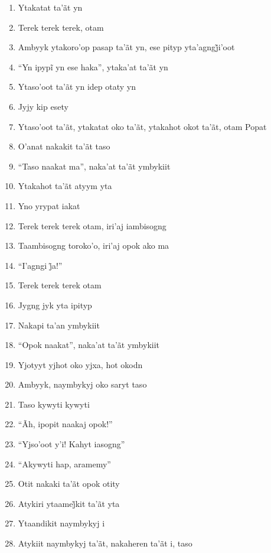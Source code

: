\begin{enumerate}
 \item Ytakatat ta'ãt yn
 \item Terek terek terek, otam
 \item Ambyyk ytakoro’op pasap ta’ãt yn, ese pityp yta’agngj̃i’oot
 \item ``Yn ipypĩ yn ese haka'', ytaka’at ta’ãt yn
 \item Ytaso'oot ta'ãt yn idep otaty yn
 \item Jyjy kip esety
 \begin{center}\end{center}
 \item Ytaso'oot ta'ãt, ytakatat oko ta'ãt, ytakahot okot ta'ãt, otam Popat
 \item O'anat nakakit ta'ãt taso
 \item ``Taso naakat ma'', naka'at ta'ãt ymbykiit
 \item Ytakahot ta'ãt atyym yta
 \item Yno yrypat iakat
 \item Terek terek terek otam, iri'aj iambisogng
 \item Taambisogng toroko'o, iri'aj opok ako ma
 \item ``I’agngi j̃a!''
 \begin{center}\end{center}
 \item Terek terek terek otam
 \item Jygng jyk yta ipityp
 \item Nakapi ta'an ymbykiit
 \item ``Opok naakat'', naka'at ta'ãt ymbykiit
 \begin{center}\end{center}
 \item Yjotyyt yjhot oko yjxa, hot okodn
 \item Ambyyk, naymbykyj oko saryt taso
 \item Taso kywyti kywyti
 \item ``Ãh, ipopit naakaj opok!''
 \item ``Yjso'oot y'i! Kahyt iasogng''
 \item ``Akywyti hap, aramemy''
 \item Otit nakaki ta'ãt opok otity
 \item Atykiri ytaamej̃kit ta’ãt yta
 \item Ytaandikit naymbykyj i
 \begin{center}\end{center}
 \item Atykiit naymbykyj ta'ãt, nakaheren ta'ãt i, taso

\end{enumerate}
